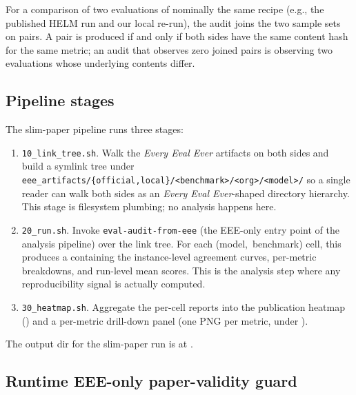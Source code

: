 \documentclass[11pt]{article}
\newcommand{\eee}{\textit{Every Eval Ever}\xspace}
\begin{document}
For a comparison of two evaluations of nominally the same recipe
  (e.g., the published HELM run and our local re-run), the audit
  joins the two sample sets on
   pairs.
A pair is produced if and only if both sides have the same content
  hash for the same metric; an audit that observes zero joined pairs
  is observing two evaluations whose underlying contents differ.

\subsection{Pipeline stages}
\label{sec:tr-pipeline-stages}

The slim-paper pipeline runs three stages:

\begin{enumerate}
  \item \texttt{10\_link\_tree.sh}.
        Walk the \eee{} artifacts on both sides and build a symlink
        tree under
        \texttt{eee\_artifacts/\{official,local\}/<benchmark>/<org>/<model>/}
        so a single reader can walk both sides as an \eee{}-shaped
        directory hierarchy.
        This stage is filesystem plumbing; no analysis happens here.
  \item \texttt{20\_run.sh}.
        Invoke \texttt{eval-audit-from-eee} (the EEE-only entry point
        of the analysis pipeline) over the link tree.
        For each \mbox{(model, benchmark)} cell, this produces a
         containing the
        instance-level agreement curves, per-metric breakdowns, and
        run-level mean scores.
        This is the analysis step where any reproducibility signal is
        actually computed.
  \item \texttt{30\_heatmap.sh}.
        Aggregate the per-cell reports into the publication heatmap
        () and a per-metric
        drill-down panel (one PNG per metric, under
        ).
\end{enumerate}

The output dir for the slim-paper run is at
  .

\subsection{Runtime EEE-only paper-validity guard}
\label{sec:tr-paper-validity-guard}
\end{document}
